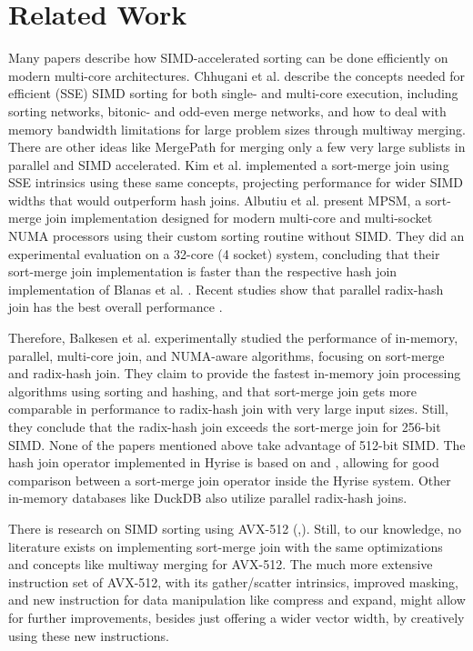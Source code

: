 \section{Related Work}
\label{sec:related-work}


Many papers describe how SIMD-accelerated sorting can be done efficiently on modern multi-core architectures. 
Chhugani et al. \cite{10.14778/1454159.1454171} describe the concepts 
needed for efficient (SSE) SIMD sorting for both single- and multi-core execution, including sorting
networks, bitonic- and odd-even merge networks, and how to deal with memory bandwidth limitations 
for large problem sizes through multiway merging. There are other ideas like MergePath \cite{MergePath}
for merging only a few very large sublists in parallel and SIMD accelerated.
Kim et al. \cite{10.14778/1687553.1687564} implemented a sort-merge join using SSE intrinsics using these same 
concepts, projecting performance for wider SIMD widths that would outperform hash joins. Albutiu 
et al. \cite{MPSM} present MPSM, a sort-merge join implementation designed for modern multi-core and
multi-socket NUMA processors using their custom sorting routine without SIMD. They did an
experimental evaluation on a 32-core (4 socket) system, concluding that their sort-merge join
implementation is faster than the respective hash join implementation of Blanas et al. \cite{10.1145/1989323.1989328}. 
Recent studies show that parallel radix-hash join has the best overall performance \cite{6544839}.

Therefore,
Balkesen et al. \cite{Balkesen} experimentally studied the performance of in-memory, parallel,
multi-core join, and NUMA-aware algorithms, focusing on sort-merge and radix-hash join.
They claim to provide the fastest in-memory join processing algorithms using sorting and hashing,
and that sort-merge join gets more comparable in performance to radix-hash join with very large 
input sizes. Still, they conclude that the radix-hash join exceeds the sort-merge join for 256-bit
SIMD. None of the papers mentioned above take advantage of 512-bit SIMD. The hash join operator
implemented in Hyrise is based on \cite{6544839} and \cite{Balkesen}, allowing for good comparison
between a sort-merge join operator inside the Hyrise system. Other in-memory databases like DuckDB 
also utilize parallel radix-hash joins.

There is research on SIMD
sorting using AVX-512 (\cite{Watkins},\cite{8855628}). Still, to our knowledge, no literature 
exists on implementing sort-merge join with the same optimizations and concepts like
multiway merging for AVX-512. The much more extensive instruction set of AVX-512, with its gather/scatter intrinsics, improved
masking, and new instruction for data manipulation like compress and expand, might allow for
further improvements, besides just offering a wider vector width, by creatively using these new
instructions.
